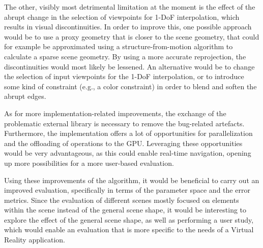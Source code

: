 
The other, visibly most detrimental limitation at the moment is the effect of the abrupt change in the selection of viewpoints for 1-DoF interpolation, which results in visual discontinuities.  
In order to improve this, one possible approach would be to use a proxy geometry that is closer to the scene geometry, that could for example be approximated using a structure-from-motion algorithm to calculate a sparse scene geometry. By using a more accurate reprojection, the discontinuities would most likely be lessened. An alternative would be to change the selection of input viewpoints for the 1-DoF interpolation, or to introduce some kind of constraint (e.g., a color constraint) in order to blend and soften the abrupt edges.

As for more implementation-related improvements, the exchange of the problematic external library is necessary to remove the bug-related artefacts. Furthermore, the implementation offers a lot of opportunities for parallelization and the offloading of operations to the GPU. Leveraging these opportunities would be very advantageous, as this could enable real-time navigation, opening up more possibilities for a more user-based evaluation.

Using these improvements of the algorithm, it would be beneficial to carry out an improved evaluation, specifically in terms of the parameter space and the error metrics. Since the evaluation of different scenes mostly focused on elements within the scene instead of the general scene shape, it would be interesting to explore the effect of the general scene shape, as well as performing a user study, which would enable an evaluation that is more specific to the needs of a Virtual Reality application.

